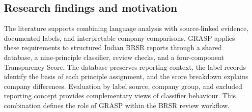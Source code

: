\subsection{Research findings and motivation}

The literature supports combining language analysis with source-linked evidence, documented labels, and interpretable company comparisons. GRASP applies these requirements to structured Indian BRSR reports through a shared database, a nine-principle classifier, review checks, and a four-component Transparency Score. The database preserves reporting context, the label records identify the basis of each principle assignment, and the score breakdown explains company differences. Evaluation by label source, company group, and excluded reporting concept provides complementary views of classifier behaviour. This combination defines the role of GRASP within the BRSR review workflow.
